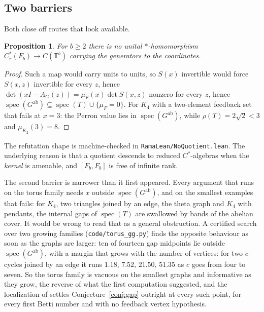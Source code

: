 \documentclass[11pt]{article}
\newtheorem{proposition}[theorem]{Proposition}
\theoremstyle{remark}
\begin{document}
\subsection{Two barriers}

Both close off routes that look available.

\begin{proposition}\label{prop:nohom}
For $b\ge2$ there is no unital $*$-homomorphism $C^*_r(F_b)\to C(\mathbb T^b)$ carrying the
generators to the coordinates.
\end{proposition}

\begin{proof}
Such a map would carry units to units, so $S(x)$ invertible would force $S(x,z)$ invertible
for every $z$, hence $\det(xI-A_G(z))=\mu_F(x)\det S(x,z)$ nonzero for every $z$, hence
$\operatorname{spec}(G^{\mathrm{ab}})\subseteq\operatorname{spec}(T)\cup\{\mu_F=0\}$. For
$K_4$ with a two-element feedback set that fails at $x=3$: the Perron value lies in
$\operatorname{spec}(G^{\mathrm{ab}})$, while $\rho(T)=2\sqrt2<3$ and $\mu_{K_2}(3)=8$.
\end{proof}

The refutation shape is machine-checked in \texttt{RamaLean/NoQuotient.lean}. The underlying
reason is that a quotient descends to reduced $C^*$-algebras when the \emph{kernel} is
amenable, and $[F_b,F_b]$ is free of infinite rank.

The second barrier is narrower than it first appeared. Every argument that runs on the torus family needs $x$ outside
$\operatorname{spec}(G^{\mathrm{ab}})$, and on the smallest examples that fails: for $K_4$,
two triangles joined by an edge, the theta graph and $K_4$ with pendants, the internal gaps
of $\operatorname{spec}(T)$ are swallowed by bands of the abelian cover. It would be wrong to
read that as a general obstruction. A certified search over two growing families
(\texttt{code/torus\_gg.py}) finds the opposite behaviour as soon as the graphs are larger:
ten of fourteen gap midpoints lie outside $\operatorname{spec}(G^{\mathrm{ab}})$, with a
margin that grows with the number of vertices: for two $c$-cycles joined by an edge it runs
$1.18,\,7.52,\,21.50,\,51.35$ as $c$ goes from four to seven. So the torus family is vacuous
on the smallest graphs and informative as they grow, the reverse of what the first
computation suggested, and the localization of \cite{PartI} settles
Conjecture~\ref{conj:gap} outright at every such point, for every first Betti number and with
no feedback vertex hypothesis.
\end{document}
